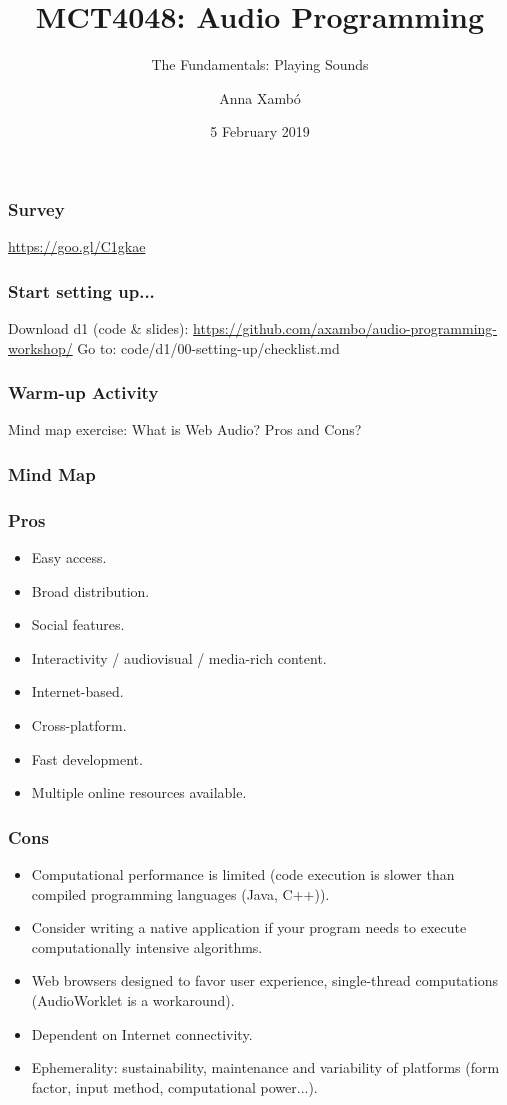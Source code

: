 \documentclass[screen, aspectratio=43]{beamer}
\title[AP-intro]{MCT4048: Audio Programming}
\subtitle{The Fundamentals: Playing Sounds}
\author[A. Xamb{\'o}]{Anna Xamb{\'o}}
\institute[NTNU]{Department of Music, NTNU}
\date{5 February 2019}
\begin{document}
\begin{frame}
  \titlepage
\end{frame}


\begin{frame}
\frametitle{Survey}
\url{https://goo.gl/C1gkae}
\end{frame}
%
\begin{frame}
\frametitle{Start setting up...}
Download d1 (code \& slides): \url{https://github.com/axambo/audio-programming-workshop/} 
\vspace{10 mm}
Go to: \textrm{code/d1/00-setting-up/checklist.md}
\end{frame}
%
\begin{frame}
\frametitle{Warm-up Activity}
Mind map exercise: What is Web Audio? Pros and Cons?
\end{frame}
%
\begin{frame}
\frametitle{Mind Map}
\end{frame}
%
\begin{frame}
\frametitle{Pros}
\begin{itemize}
\item Easy access.
\item Broad distribution.
\item Social features.
\item Interactivity / audiovisual / media-rich content.
\item Internet-based.
\item Cross-platform.
\item Fast development.
\item Multiple online resources available.
\end{itemize}
\end{frame}
%
\begin{frame}
\frametitle{Cons}
\begin{itemize}
\item Computational performance is limited (code execution is slower than compiled programming languages (Java, C++)).
\item Consider writing a native application if your program needs to execute computationally intensive algorithms.
\item Web browsers designed to favor user experience, single-thread computations (AudioWorklet is a workaround).
\item Dependent on Internet connectivity.
\item Ephemerality: sustainability, maintenance and variability of platforms (form factor, input method, computational power...).
\end{itemize}
\end{frame}
\end{document}
